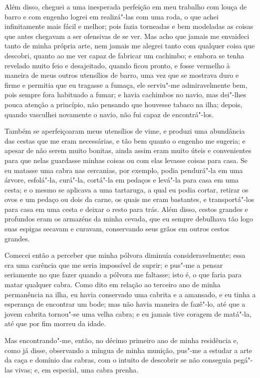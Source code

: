 Além disso, cheguei a uma inesperada perfeição em meu trabalho com louça
de barro e com engenho logrei em realizá"-las com uma roda, o que achei
infinitamente mais fácil e melhor; pois fazia torneadas e bem modeladas
as coisas que antes chegavam a ser ofensivas de se ver. Mas acho que
jamais me envaideci tanto de minha própria arte, nem jamais me alegrei
tanto com qualquer coisa que descobri, quanto ao me ver capaz de
fabricar um cachimbo; e embora se tenha revelado muito feio e
desajeitado, quando ficou pronto, e fosse vermelho à maneira de meus
outros utensílios de barro, uma vez que se mostrava duro e firme e
permitia que eu tragasse a fumaça, ele serviu"-me admiravelmente bem,
pois sempre fora habituado a fumar; e havia cachimbos no navio, mas
dei"-lhes pouca atenção a princípio, não pensando que houvesse tabaco na
ilha; depois, quando vasculhei novamente o navio, não fui capaz de
encontrá"-los.

Também se aperfeiçoaram meus utensílios de vime, e produzi uma
abundância das cestas que me eram necessárias, e tão bem quanto o
engenho me sugeria; e apesar de não serem muito bonitas, ainda assim
eram muito úteis e convenientes para que nelas guardasse minhas coisas
ou com elas levasse coisas para casa. Se eu matasse uma cabra nas
cercanias, por exemplo, podia pendurá"-la em uma árvore, esfolá"-la,
curá"-la, cortá"-la em pedaços e levá"-la para casa em uma cesta; e o mesmo
se aplicava a uma tartaruga, a qual eu podia cortar, retirar os ovos e
um pedaço ou dois da carne, os quais me eram bastantes, e transportá"-los
para casa em uma cesta e deixar o resto para trás. Além disso, cestos
grandes e profundos eram os armazéns da minha cevada, que eu sempre
debulhava tão logo suas espigas secavam e curavam, conservando seus
grãos em outros cestos grandes.

Comecei então a perceber que minha pólvora diminuía consideravelmente;
essa era uma carência que me seria impossível de suprir; e pus"-me a
pensar seriamente no que fazer quando a pólvora me faltasse; isto é, o
que faria para matar qualquer cabra. Como dito em relação ao terceiro
ano de minha permanência na ilha, eu havia conservado uma cabrita e a
amansado, e eu tinha a esperança de encontrar um bode; mas não havia
maneira de fazê"-lo, até que a jovem cabrita tornou"-se uma velha cabra; e
eu jamais tive coragem de matá"-la, até que por fim morreu da idade.

Mas encontrando"-me, então, no décimo primeiro ano de minha residência e,
como já disse, observando a míngua de minha munição, pus"-me a estudar a
arte da caça e domínio das cabras, com o intuito de descobrir se não
conseguia pegá"-las vivas; e, em especial, uma cabra prenha.

